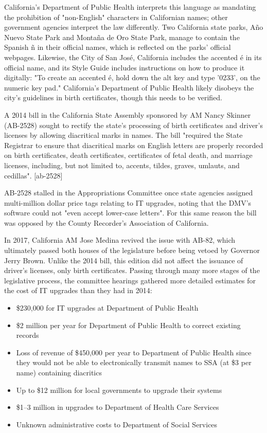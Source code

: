 California's Department of Public Health interprets this language as mandating
the prohibition of "non-English" characters in Californian names; other
government agencies interpret the law differently. Two California state parks,
Año Nuevo State Park and Montaña de Oro State Park, manage to contain the
Spanish ñ in their official names, which is reflected on the parks' official
webpages. \parencite{año-nuevo} \parencite{montaña-de-oro} Likewise, the City of
San José, California includes the accented é in its official name, and its Style
Guide includes instructions on how to produce it digitally: "To create an
accented é, hold down the alt key and type '0233'‚ on the numeric key pad."
\textcite{san-josé} California's Department of Public Health likely disobeys the
city's guidelines in birth certificates, though this needs to be verified.

A 2014 bill in the California State Assembly sponsored by AM Nancy Skinner
(AB-2528) sought to rectify the state's processing of birth certificates and
driver's licenses by allowing diacritical marks in names. The bill "required the
State Registrar to ensure that diacritical marks on English letters are properly
recorded on birth certificates, death certificates, certificates of fetal death,
and marriage licenses, including, but not limited to, accents, tildes, graves,
umlauts, and cedillas". [ab-2528]

AB-2528 stalled in the Appropriations Committee once state agencies assigned
multi-million dollar price tags relating to IT upgrades, noting that the DMV's
software could not "even accept lower-case letters". For this same reason the
bill was opposed by the County Recorder's Association of California.

In 2017, California AM Jose Medina revived the issue with AB-82, which
ultimately passed both houses of the legislature before being vetoed by Governor
Jerry Brown. Unlike the 2014 bill, this edition did not affect the issuance of
driver's licenses, only birth certificates. Passing through many more stages of
the legislative process, the committee hearings gathered more detailed estimates
for the cost of IT upgrades than they had in 2014:

\begin{itemize}

\item \$230,000 for IT upgrades at Department of Public Health
\item \$2 million per year for Department of Public Health to correct existing
records
\item Loss of revenue of \$450,000 per year to Department of Public Health since
they would not be able to electronically transmit names to SSA (at \$3 per name)
containing diacritics
\item Up to \$12 million for local governments to upgrade their systems
\item \$1--3 million in upgrades to Department of Health Care Services
\item Unknown administrative costs to Department of Social Services

\end{itemize}

